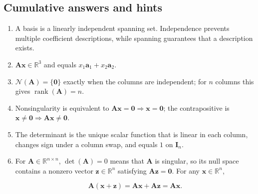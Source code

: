 \documentclass[
  australian,
  12pt,
  letterpaper,
  DIV=11,
  numbers=noendperiod,
  twoside]{scrreprt}
\begin{document}
\subsection*{Cumulative answers and
hints}\label{cumulative-answers-and-hints}

\begin{enumerate}
\def\labelenumi{\arabic{enumi}.}
\item
  A basis is a linearly independent spanning set. Independence prevents
  multiple coefficient descriptions, while spanning guarantees that a
  description exists.
\item
  \(\mathbf A\mathbf x\in\mathbb R^3\) and equals
  \(x_1\mathbf a_1+x_2\mathbf a_2\).
\item
  \(\mathcal N(\mathbf A)=\{\mathbf0\}\) exactly when the columns are
  independent; for \(n\) columns this gives
  \(\operatorname{rank}(\mathbf A)=n\).
\item
  Nonsingularity is equivalent to
  \(\mathbf A\mathbf x=\mathbf0\Rightarrow\mathbf x=\mathbf0\); the
  contrapositive is
  \(\mathbf x\neq\mathbf0\Rightarrow\mathbf A\mathbf x\neq\mathbf0\).
\item
  The determinant is the unique scalar function that is linear in each
  column, changes sign under a column swap, and equals \(1\) on
  \(\mathbf I_n\).
\item
  For \(\mathbf A\in\mathbb R^{n\times n}\), \(\det(\mathbf A)=0\) means
  that \(\mathbf A\) is singular, so its null space contains a nonzero
  vector \(\mathbf z\in\mathbb R^n\) satisfying
  \(\mathbf A\mathbf z=\mathbf0\). For any \(\mathbf x\in\mathbb R^n\),

  \[
  \mathbf A(\mathbf x+\mathbf z)
  =\mathbf A\mathbf x+\mathbf A\mathbf z
  =\mathbf A\mathbf x.
  \]


\end{enumerate}
\end{document}
